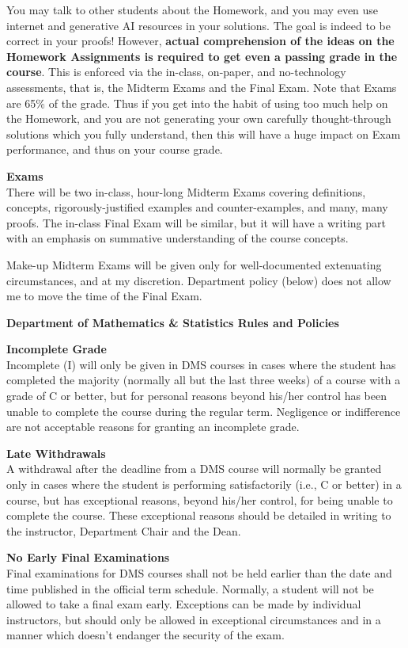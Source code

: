\documentclass[12pt]{article}
\renewcommand{\emph}[1]{\textsf{\textbf{#1}}}
\newcommand{\localhead}[1]{\par\smallskip\textbf{#1} \smallskip\nobreak\\}%
\def\heading#1{\localhead{\large\emph{#1}}}
\def\subheading#1{\localhead{\emph{#1}}}
\begin{document}
You may talk to other students about the Homework, and you may even use internet and generative AI resources in your solutions.  The goal is indeed to be correct in your proofs!  However, \emph{actual comprehension of the ideas on the Homework Assignments is required to get even a passing grade in the course}.   This is enforced via the in-class, on-paper, and no-technology assessments, that is, the Midterm Exams and the Final Exam.  Note that Exams are 65\% of the grade.  Thus if you get into the habit of using too much help on the Homework, and you are not generating your own carefully thought-through solutions which you fully understand, then this will have a huge impact on Exam performance, and thus on your course grade.

\heading{Exams}
There will be two in-class, hour-long Midterm Exams covering definitions, concepts, rigorously-justified examples and counter-examples, and many, many proofs.  The in-class Final Exam will be similar, but it will have a writing part with an emphasis on summative understanding of the course concepts.

Make-up Midterm Exams will be given only for well-documented extenuating circumstances, and at my discretion.  Department policy (below) does not allow me to move the time of the Final Exam.


\clearpage\newpage
\phantom{foo}
\heading{Department of Mathematics \& Statistics Rules and Policies}
\vskip -15pt

\subheading{Incomplete Grade} 
Incomplete (I) will only be given in
  DMS courses in cases where
  the student has completed the majority (normally all but the last
  three weeks) of a course with a grade of C or better, but for
  personal reasons beyond his/her control has been unable to complete
  the course during the regular term. Negligence or indifference are
  not acceptable reasons for granting an incomplete grade.

\subheading{Late Withdrawals} 
A withdrawal after the deadline from a DMS course will
  normally be granted only in cases where the student is performing
  satisfactorily (i.e., C or better) in a course, but has exceptional
  reasons, beyond his/her control, for being unable to complete the
  course.  These exceptional reasons should be detailed in writing to
  the instructor, Department Chair and the Dean.

\subheading{No Early Final Examinations}
Final examinations for DMS courses shall not be held earlier than the date and time published in the official term schedule.  Normally, a student will not be allowed to take a final exam early.  Exceptions can be made by individual instructors, but should only be allowed in exceptional circumstances and in a manner which doesn't endanger the security of the exam.
\end{document}
